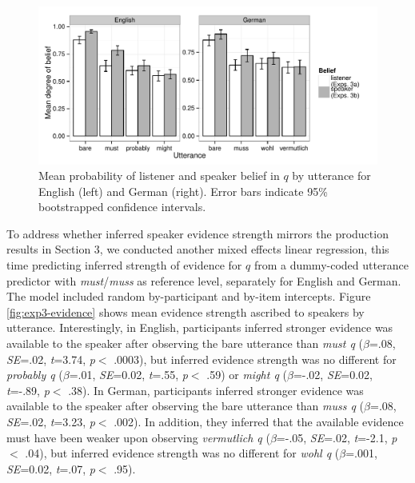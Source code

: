 \documentclass[11pt]{article}
\newcommand{\figref}[1]{Figure \ref{#1}}
\begin{document}
\begin{figure}
	\centering
	\includegraphics[width=\textwidth]{pics/mean-beliefs}
	\caption{Mean probability of listener and speaker belief in $q$ by utterance for English (left) and German (right). Error bars indicate 95\% bootstrapped confidence intervals.}
	\label{fig:expt3}
\end{figure}

To address whether inferred speaker evidence strength mirrors the production results in Section 3, we conducted another mixed effects linear regression, this time predicting inferred strength of evidence for $q$ from a dummy-coded utterance predictor with \emph{must}/\emph{muss} as reference level, separately for English and German. The model included random by-participant and by-item intercepts.  \figref{fig:exp3-evidence} shows mean evidence strength ascribed to speakers by utterance. Interestingly, in English, participants inferred stronger evidence was available to the speaker after observing the bare utterance than \emph{must q} ($\beta$=.08, \emph{SE}=.02, \emph{t}=3.74, \emph{p}$<$ .0003), but inferred evidence strength was no different for \emph{probably q} ($\beta$=.01, \emph{SE}=0.02, \emph{t}=.55, \emph{p}$<$ .59) or \emph{might q} ($\beta$=-.02, \emph{SE}=0.02, \emph{t}=-.89, \emph{p}$<$ .38). In German, participants inferred stronger evidence was available to the speaker after observing the bare utterance than \emph{muss q} ($\beta$=.08, \emph{SE}=.02, \emph{t}=3.23, \emph{p}$<$ .002). In addition, they inferred that the available evidence must have been weaker upon observing \emph{vermutlich q} ($\beta$=-.05, \emph{SE}=.02, \emph{t}=-2.1, \emph{p}$<$ .04), but inferred evidence strength was no different for \emph{wohl q} ($\beta$=.001, \emph{SE}=0.02, \emph{t}=.07, \emph{p}$<$ .95). %
\end{document}
